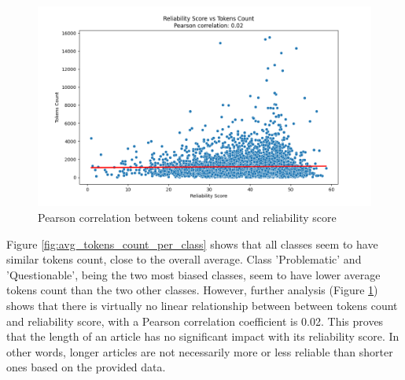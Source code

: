 \begin{figure}[ht]
    \centering
    \includegraphics[width=0.9\linewidth]{figures/correlation_tokens_reliability_score.png}
    \caption{Pearson correlation between tokens count and reliability score}
    \label{fig:pearson_correlation}
\end{figure}


Figure \ref{fig:avg_tokens_count_per_class} shows that all classes seem to have similar tokens count, close to the overall average. Class 'Problematic' and 'Questionable', being the two most biased classes, seem to have lower average tokens count than the two other classes. However, further analysis (Figure \ref{fig:pearson_correlation}) shows that there is virtually no linear relationship between between tokens count and reliability score, with a Pearson correlation coefficient is 0.02. This proves that the length of an article has no significant impact with its reliability score. In other words, longer articles are not necessarily more or less reliable than shorter ones based on the provided data.

